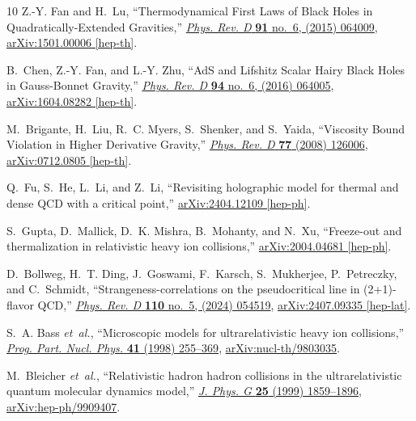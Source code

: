 \documentclass[a4paper,12pt]{article}
\numberwithin{equation}{section}
\begin{document}
\begin{thebibliography}{10}
	Z.-Y. Fan and H.~Lu, ``{Thermodynamical First Laws of Black Holes in
		Quadratically-Extended Gravities},''
	\href{http://dx.doi.org/10.1103/PhysRevD.91.064009}{{\em Phys. Rev. D}
		{\bfseries 91} no.~6, (2015) 064009},
	\href{http://arxiv.org/abs/1501.00006}{{\ttfamily arXiv:1501.00006
			[hep-th]}}.
	
	B.~Chen, Z.-Y. Fan, and L.-Y. Zhu, ``{AdS and Lifshitz Scalar Hairy Black Holes
		in Gauss-Bonnet Gravity},''
	\href{http://dx.doi.org/10.1103/PhysRevD.94.064005}{{\em Phys. Rev. D}
		{\bfseries 94} no.~6, (2016) 064005},
	\href{http://arxiv.org/abs/1604.08282}{{\ttfamily arXiv:1604.08282
			[hep-th]}}.
	
	M.~Brigante, H.~Liu, R.~C. Myers, S.~Shenker, and S.~Yaida, ``{Viscosity Bound
		Violation in Higher Derivative Gravity},''
	\href{http://dx.doi.org/10.1103/PhysRevD.77.126006}{{\em Phys. Rev. D}
		{\bfseries 77} (2008) 126006},
	\href{http://arxiv.org/abs/0712.0805}{{\ttfamily arXiv:0712.0805 [hep-th]}}.
	
	Q.~Fu, S.~He, L.~Li, and Z.~Li, ``{Revisiting holographic model for thermal and
		dense QCD with a critical point},''
	\href{http://arxiv.org/abs/2404.12109}{{\ttfamily arXiv:2404.12109
			[hep-ph]}}.
	
	S.~Gupta, D.~Mallick, D.~K. Mishra, B.~Mohanty, and N.~Xu, ``{Freeze-out and
		thermalization in relativistic heavy ion collisions},''
	\href{http://arxiv.org/abs/2004.04681}{{\ttfamily arXiv:2004.04681
			[hep-ph]}}.
	
	D.~Bollweg, H.~T. Ding, J.~Goswami, F.~Karsch, S.~Mukherjee, P.~Petreczky, and
	C.~Schmidt, ``{Strangeness-correlations on the pseudocritical line in
		(2+1)-flavor QCD},''
	\href{http://dx.doi.org/10.1103/PhysRevD.110.054519}{{\em Phys. Rev. D}
		{\bfseries 110} no.~5, (2024) 054519},
	\href{http://arxiv.org/abs/2407.09335}{{\ttfamily arXiv:2407.09335
			[hep-lat]}}.
	
	S.~A. Bass {\em et~al.}, ``{Microscopic models for ultrarelativistic heavy ion
		collisions},'' \href{http://dx.doi.org/10.1016/S0146-6410(98)00058-1}{{\em
			Prog. Part. Nucl. Phys.} {\bfseries 41} (1998) 255--369},
	\href{http://arxiv.org/abs/nucl-th/9803035}{{\ttfamily
			arXiv:nucl-th/9803035}}.
	
	M.~Bleicher {\em et~al.}, ``{Relativistic hadron hadron collisions in the
		ultrarelativistic quantum molecular dynamics model},''
	\href{http://dx.doi.org/10.1088/0954-3899/25/9/308}{{\em J. Phys. G}
		{\bfseries 25} (1999) 1859--1896},
	\href{http://arxiv.org/abs/hep-ph/9909407}{{\ttfamily arXiv:hep-ph/9909407}}.
	

\end{thebibliography}
\end{document}
